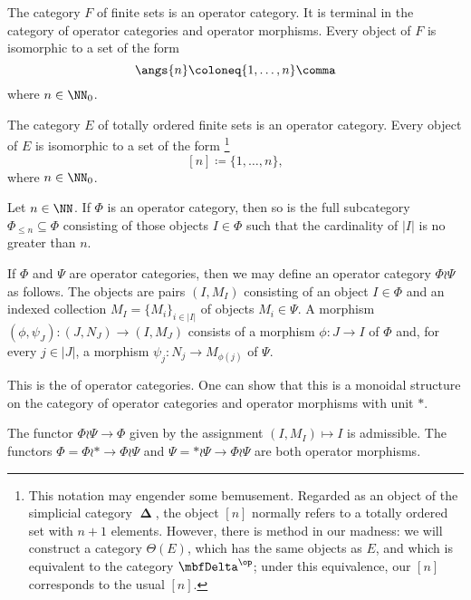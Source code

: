\begin{eg}
	The category $ F $ of finite sets is an operator category.
	It is terminal in the category of operator categories and operator morphisms.
	Every object of $ F $ is isomorphic to a set of the form
	\[
		\angs{n} \coloneq \{ 1, \ldots, n \} \comma
	\]
	where $ n \in \NN_0 $.
\end{eg}

\begin{eg}
	The category $ E $ of totally ordered finite sets is an operator category.
	Every object of $ E $ is isomorphic to a set of the form%
	\footnote{This notation may engender some bemusement.
		Regarded as an object of the simplicial category $ \mbfDelta $,
		the object $ [n] $ normally refers to
		a totally ordered set with $ n+1 $ elements.
		However, there is method in our madness:
		we will construct a category $ \Theta(E) $, which
		has the same objects as $ E $,
		and which is equivalent to the category $ \mbfDelta^{\op} $;
		under this equivalence, our $ [n] $ corresponds to the usual $ [n] $.}
	\[
		[n] \coloneq \{ 1, \ldots, n \} \comma
	\]
	where $ n \in \NN_0 $.
\end{eg}

\begin{eg}
	Let $ n \in \NN $.
	If $ \Phi $ is an operator category, then
	so is the full subcategory $ \Phi_{\leq n} \subseteq \Phi $
	consisting of those objects $ I \in \Phi $ such that
	the cardinality of $ |I| $ is no greater than $ n $.
\end{eg}

\begin{construction}
	If $ \Phi $ and $ \Psi $ are operator categories, then
	we may define an operator category $ \Phi \wr \Psi $ as follows.
	The objects are pairs $ (I, M_I) $ consisting of
	an object $ I \in \Phi $ and
	an indexed collection $ M_I = \{M_i\}_{i \in |I|} $ of
	objects $ M_i \in \Psi $.
	A morphism $ (\phi, \psi_J) \colon (J, N_J) \to (I, M_J) $ consists of
	a morphism $ \phi \colon J \to I $ of $ \Phi $ and,
	for every $ j \in |J| $, a morphism $ \psi_j \colon N_j \to M_{\phi(j)} $ of $ \Psi $.

	This is the  of operator categories.
	One can show that this is a monoidal structure on
	the category of operator categories and operator morphisms
	with unit $ \ast $.

	The functor $ \Phi \wr \Psi \to \Phi $
	given by the assignment $ (I, M_I) \mapsto I $ is admissible.
	The functors $ \Phi = \Phi \wr \ast \to \Phi \wr \Psi $ and
	$ \Psi = \ast \wr \Psi \to \Phi \wr \Psi $ are both
	operator morphisms.
\end{construction}

